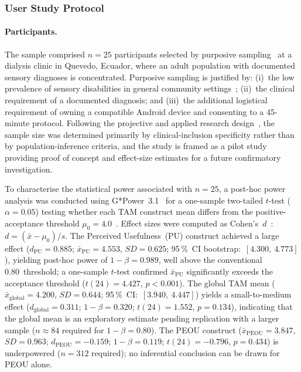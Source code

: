 \documentclass[journal]{IEEEtran}
\begin{document}
	\subsubsection{User Study Protocol}
	
	\paragraph{Participants.}
	The sample comprised $n{=}25$ participants selected by
	purposive sampling~\cite{hernandez2014} at a dialysis clinic
	in Quevedo, Ecuador, where an adult population with documented
	sensory diagnoses is concentrated.
	Purposive sampling is justified by: (i)~the low prevalence of
	sensory disabilities in general community settings~\cite{who2011};
	(ii)~the clinical requirement of a documented diagnosis; and
	(iii)~the additional logistical requirement of owning a compatible
	Android device and consenting to a 45-minute protocol.
	Following the projective and applied research design~\cite{hernandez2014},
	the sample size was determined primarily by clinical-inclusion specificity
	rather than by population-inference criteria, and the study is framed as
	a pilot study providing proof of concept and effect-size estimates for
	a future confirmatory investigation.
	
	To characterise the statistical power associated with $n{=}25$, a
	post-hoc power analysis was conducted using G*Power~3.1~\cite{faul2007}
	for a one-sample two-tailed $t$-test ($\alpha{=}0.05$) testing whether
	each TAM construct mean differs from the positive-acceptance
	threshold $\mu_0{=}4.0$~\cite{kim2024,holden2010}.
	Effect sizes were computed as Cohen's~$d$~\cite{cohen1988}:
	$d = (\bar{x} - \mu_0)/s$.
	The Perceived Usefulness~(PU) construct achieved a large effect
	($d_{\text{PU}}{=}0.885$; $\bar{x}_{\text{PU}}{=}4.553$,
	$SD{=}0.625$; 95\,\%~CI bootstrap:~$[4.300,\ 4.773]$),
	yielding post-hoc power of $1{-}\beta{=}0.989$,
	well above the conventional 0.80~threshold;
	a one-sample $t$-test confirmed $\bar{x}_{\text{PU}}$
	significantly exceeds the acceptance threshold
	($t(24){=}4.427$, $p{<}0.001$).
	The global TAM mean ($\bar{x}_{\text{global}}{=}4.200$,
	$SD{=}0.644$; 95\,\%~CI:~$[3.940,\ 4.447]$) yields
	a small-to-medium effect ($d_{\text{global}}{=}0.311$;
	$1{-}\beta{=}0.320$; $t(24){=}1.552$, $p{=}0.134$),
	indicating that the global mean is an exploratory estimate
	pending replication with a larger sample ($n{\approx}84$ required
	for $1{-}\beta{=}0.80$).
	The PEOU construct ($\bar{x}_{\text{PEOU}}{=}3.847$,
	$SD{=}0.963$; $d_{\text{PEOU}}{=}{-}0.159$; $1{-}\beta{=}0.119$;
	$t(24){=}{-}0.796$, $p{=}0.434$) is underpowered
	($n{=}312$ required); no inferential conclusion can be drawn
	for PEOU alone.
	
\end{document}
